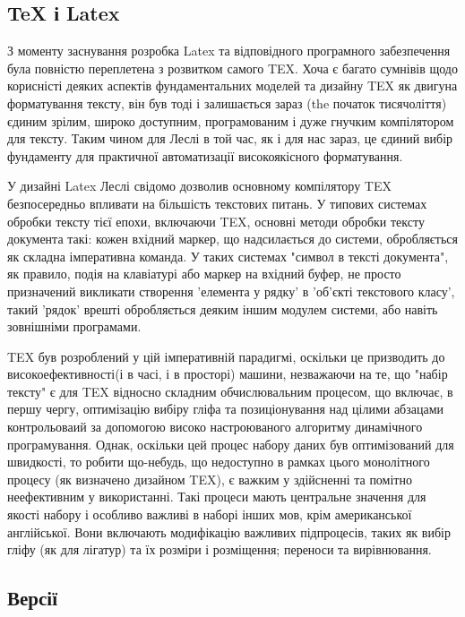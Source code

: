 	\subsection{TeX і Latex}
	
	З моменту заснування розробка Latex та відповідного програмного забезпечення була повністю переплетена з розвитком самого TEX. 
	Хоча є багато сумнівів щодо корисністі деяких аспектів фундаментальних моделей та дизайну
	TEX як двигуна форматування тексту, він був тоді і залишається зараз (the
	початок тисячоліття) єдиним зрілим, широко доступним,
	програмованим і дуже гнучким компілятором для тексту. Таким чином для
	 Леслі в той час, як і для нас зараз, це єдиний вибір фундаменту
	для практичної автоматизації високоякісного форматування.
	
	У дизайні Latex Леслі свідомо дозволив основному компілятору TEX безпосередньо впливати на більшість текстових питань.
	У типових системах обробки тексту тієї епохи, включаючи TEX,
	основні методи обробки тексту документа такі: кожен вхідний маркер, що надсилається до системи, обробляється
	як складна імперативна команда. У таких системах "символ в
	тексті документа", як правило, подія на клавіатурі або маркер на
	вхідний буфер, не просто призначений викликати створення
	'елемента у рядку' в 'об'єкті текстового класу', такий 'рядок'
	врешті обробляється деяким іншим модулем системи, або
	навіть зовнішніми програмами.
	
	
	TEX був розроблений у цій імперативній парадигмі, оскільки це призводить до високоефективності(і в часі, і в просторі) машини, незважаючи на те, що "набір тексту" є для TEX відносно складним обчислювальним процесом, що включає, в першу чергу, оптимізацію	вибіру гліфа та позиціонування над цілими абзацами контрольоваий	за допомогою високо настроюваного алгоритму динамічного програмування. Однак, оскільки цей процес набору даних був оптимізований для швидкості, то робити що-небудь, що недоступно в рамках цього монолітного процесу (як визначено дизайном TEX), є важким у здійсненні та помітно неефективним у використанні. Такі процеси мають центральне значення для	якості набору і особливо важливі в наборі	інших мов, крім американської англійської. Вони включають модифікацію	важливих підпроцесів, таких як вибір гліфу (як для лігатур)	та їх розміри і розміщення; переноси та вирівнювання.
	
	
	\subsection{Версії}
	
